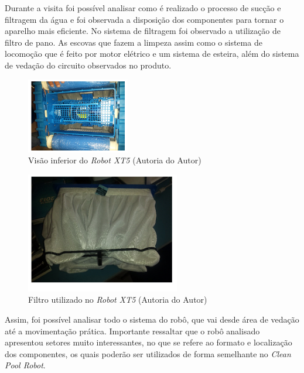 Durante a visita foi possível analisar como é realizado o processo de sucção e 
filtragem da água e foi observada a disposição dos componentes para tornar o 
aparelho mais eficiente. No sistema de filtragem foi observado a utilização de 
filtro de pano. As escovas que fazem a limpeza assim como o sistema de 
locomoção que é feito por motor elétrico e um sistema de esteira, além do 
sistema de vedação do circuito observados no produto.

\begin{figure}[!h]
   \centering
    \includegraphics[width=0.4\textwidth]{figures/bottom_view_robot.jpg}
    \caption{Visão inferior do \textit{Robot XT5} (\textsf{Autoria do Autor})}
    \label{fig:bottow_view_robot}
\end{figure}
\FloatBarrier

\begin{figure}[!h]
   \centering
    \includegraphics[width=0.6\textwidth]{figures/robot_filter.jpg}
    \caption{Filtro utilizado no \textit{Robot XT5} (\textsf{Autoria do Autor})}
    \label{fig:robot_filter}
\end{figure}
\FloatBarrier

Assim, foi possível analisar todo o sistema do robô, que vai desde área de 
vedação até a movimentação prática. Importante ressaltar que o robô 
analisado apresentou setores muito interessantes, no que se refere ao formato 
e localização dos componentes, os quais poderão ser utilizados de forma 
semelhante no \textit{Clean Pool Robot}.

